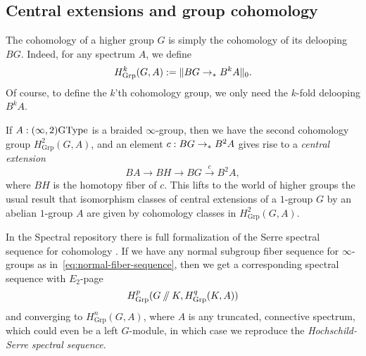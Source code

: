 \subsection{Central extensions and group cohomology}
\label{sec:group-cohomology}

The cohomology of a higher group $G$ is simply the cohomology of its
delooping $BG$. Indeed, for any spectrum $A$, we define
\[
  H_{\mathrm{Grp}}^k(G, A) := \trunc{0}{BG \to_\pt B^kA}.
\]
Of course, to define the $k$'th cohomology group, we only need the
$k$-fold delooping $B^kA$.

If $A:(\infty,2)\GType$ is a braided $\infty$-group, then
we have the second cohomology group $H_{\mathrm{Grp}}^2(G, A)$, and an
element $c:BG \to_\pt B^2A$ gives rise to a \emph{central extension}
\[
  BA \to BH \to BG \xrightarrow{c}{} B^2A,
\]
where $BH$ is the homotopy fiber of $c$.  This lifts to the world of
higher groups the usual result that isomorphism classes of central
extensions of a $1$-group $G$ by an abelian $1$-group $A$
are given by cohomology classes in $H_{\mathrm{Grp}}^2(G, A)$.

\smallskip

In the Spectral repository there is full formalization of the Serre
spectral sequence for cohomology \cite{SerreSpectralSequence}.
If we have any normal subgroup fiber sequence for $\infty$-groups as
in~\eqref{eq:normal-fiber-sequence}, then we get a corresponding
spectral sequence with $E_2$-page
\[
  H_{\mathrm{Grp}}^p(G \dblslash K, H_{\mathrm{Grp}}^q(K, A))
\]
and converging to $H_{\mathrm{Grp}}^n(G, A)$, where $A$ is any
truncated, connective spectrum, which could even be a left $G$-module,
in which case we reproduce the \emph{Hochschild-Serre spectral
  sequence}.
